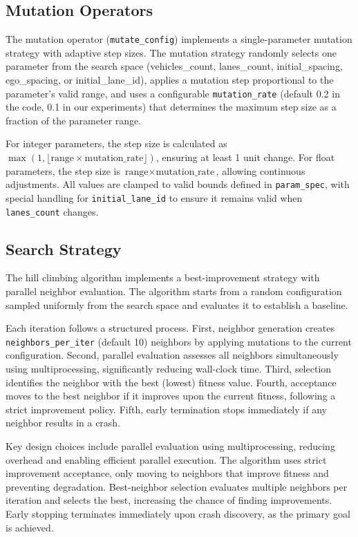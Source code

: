 \documentclass[11pt,a4paper]{article}
\begin{document}
\subsection{Mutation Operators}

The mutation operator (\texttt{mutate\_config}) implements a single-parameter mutation strategy with adaptive step sizes. The mutation strategy randomly selects one parameter from the search space (vehicles\_count, lanes\_count, initial\_spacing, ego\_spacing, or initial\_lane\_id), applies a mutation step proportional to the parameter's valid range, and uses a configurable \texttt{mutation\_rate} (default 0.2 in the code, 0.1 in our experiments) that determines the maximum step size as a fraction of the parameter range.

For integer parameters, the step size is calculated as $\max(1, \lfloor \text{range} \times \text{mutation\_rate} \rfloor)$, ensuring at least 1 unit change. For float parameters, the step size is $\text{range} \times \text{mutation\_rate}$, allowing continuous adjustments. All values are clamped to valid bounds defined in \texttt{param\_spec}, with special handling for \texttt{initial\_lane\_id} to ensure it remains valid when \texttt{lanes\_count} changes.

\subsection{Search Strategy}

The hill climbing algorithm implements a best-improvement strategy with parallel neighbor evaluation. The algorithm starts from a random configuration sampled uniformly from the search space and evaluates it to establish a baseline.

Each iteration follows a structured process. First, neighbor generation creates \texttt{neighbors\_per\_iter} (default 10) neighbors by applying mutations to the current configuration. Second, parallel evaluation assesses all neighbors simultaneously using multiprocessing, significantly reducing wall-clock time. Third, selection identifies the neighbor with the best (lowest) fitness value. Fourth, acceptance moves to the best neighbor if it improves upon the current fitness, following a strict improvement policy. Fifth, early termination stops immediately if any neighbor results in a crash.

Key design choices include parallel evaluation using multiprocessing, reducing overhead and enabling efficient parallel execution. The algorithm uses strict improvement acceptance, only moving to neighbors that improve fitness and preventing degradation. Best-neighbor selection evaluates multiple neighbors per iteration and selects the best, increasing the chance of finding improvements. Early stopping terminates immediately upon crash discovery, as the primary goal is achieved.
\end{document}
